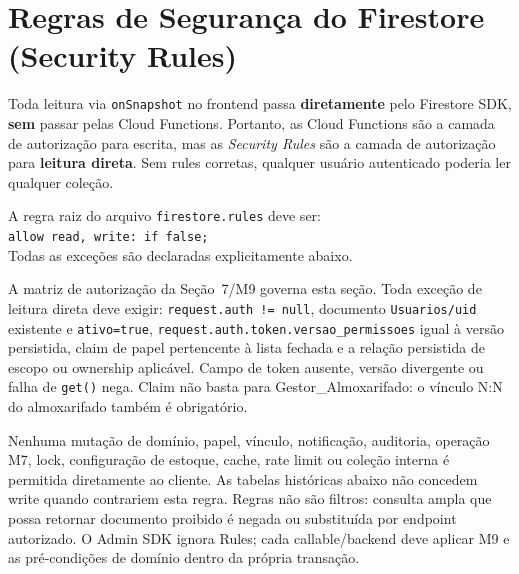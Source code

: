 \newpage
\section{Regras de Segurança do Firestore (Security Rules)}

\begin{explicacao}
Toda leitura via \texttt{onSnapshot} no frontend passa \textbf{diretamente} pelo Firestore SDK, \textbf{sem} passar pelas Cloud Functions. Portanto, as Cloud Functions são a camada de autorização para escrita, mas as \textit{Security Rules} são a camada de autorização para \textbf{leitura direta}. Sem rules corretas, qualquer usuário autenticado poderia ler qualquer coleção.
\end{explicacao}

\begin{regra}
A regra raiz do arquivo \texttt{firestore.rules} deve ser:\\
\texttt{allow read, write: if false;}\\
Todas as exceções são declaradas explicitamente abaixo.
\end{regra}

\begin{regra}
A matriz de autorização da Seção~7/M9 governa esta seção. Toda exceção de
leitura direta deve exigir: \texttt{request.auth != null}, documento
\texttt{Usuarios/uid} existente e \texttt{ativo=true},
\texttt{request.auth.token.versao\_permissoes} igual à versão persistida,
claim de papel pertencente à lista fechada e a relação persistida de escopo ou
ownership aplicável. Campo de token ausente, versão divergente ou falha de
\texttt{get()} nega. Claim não basta para Gestor\_Almoxarifado: o vínculo N:N
do almoxarifado também é obrigatório.

Nenhuma mutação de domínio, papel, vínculo, notificação, auditoria, operação
M7, lock, configuração de estoque, cache, rate limit ou coleção interna é
permitida diretamente ao cliente. As tabelas históricas abaixo não concedem
write quando contrariem esta regra. Regras não são filtros: consulta ampla que
possa retornar documento proibido é negada ou substituída por endpoint
autorizado. O Admin SDK ignora Rules; cada callable/backend deve aplicar M9 e
as pré-condições de domínio dentro da própria transação.
\end{regra}


